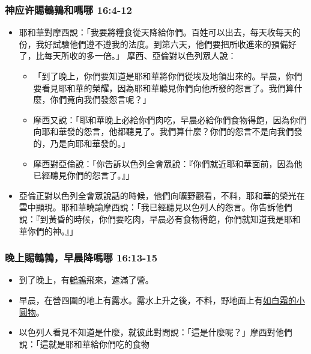 \subsubsection{神应许賜鵪鶉和嗎哪 16:4-12}
\begin{itemize} 
\itemsep-.35em
\item 耶和華對摩西說：「我要將糧食從天降給你們。百姓可以出去，每天收每天的份，我好試驗他們遵不遵我的法度。到第六天，他們要把所收進來的預備好了，比每天所收的多一倍。」 摩西、亞倫對以色列眾人說：
\begin{itemize} 
\itemsep-.35em
\item 「到了晚上，你們要知道是耶和華將你們從埃及地領出來的。早晨，你們要看見耶和華的榮耀，因為耶和華聽見你們向他所發的怨言了。我們算什麼，你們竟向我們發怨言呢？」 
\item 摩西又說：「耶和華晚上必給你們肉吃，早晨必給你們食物得飽，因為你們向耶和華發的怨言，他都聽見了。我們算什麼？你們的怨言不是向我們發的，乃是向耶和華發的。」 
\item 摩西對亞倫說：「你告訴以色列全會眾說：『你們就近耶和華面前，因為他已經聽見你們的怨言了。』」 
\end{itemize}
\item 亞倫正對以色列全會眾說話的時候，他們向曠野觀看，不料，耶和華的榮光在雲中顯現。耶和華曉諭摩西說：「我已經聽見以色列人的怨言。你告訴他們說：『到黃昏的時候，你們要吃肉，早晨必有食物得飽，你們就知道我是耶和華你們的神。』」
\end{itemize}

\subsubsection{晚上賜鵪鶉，早晨降嗎哪 16:13-15}
\begin{itemize} 
\itemsep-.35em
\item 到了晚上，有\underline{鵪鶉}飛來，遮滿了營。
\item 早晨，在營四圍的地上有露水。露水上升之後，不料，野地面上有\underline{如白霜的小圓物}。
\item 以色列人看見不知道是什麼，就彼此對問說：「這是什麼呢？」摩西對他們說：「這就是耶和華給你們吃的食物
\end{itemize}

